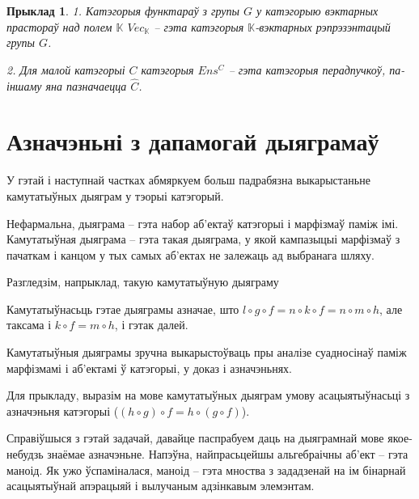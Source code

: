 \documentclass[a4paper,12pt]{book}
\newtheorem{example}{Прыклад}[section]
\begin{document}
\begin{example}
  1. Катэгорыя функтараў з групы $G$ у катэгорыю вэктарных прастораў над
  полем $\mathbb{K}$ $Vec_{\mathbb{K}}$ -- гэта катэгорыя
  $\mathbb{K}$-вэктарных рэпрэзэнтацый групы $G$.

  2. Для малой катэгорыі $C$ катэгорыя $Ens^C$ -- гэта катэгорыя
  перадпучкоў, па-іншаму яна пазначаецца $\hat{C}$.
\end{example}

\section{Азначэньні з дапамогай дыяграмаў}

У гэтай і наступнай частках абмяркуем больш падрабязна выкарыстаньне
камутатыўных дыяграм у тэорыі катэгорый.

Нефармальна, дыяграма -- гэта набор аб'ектаў катэгорыі і марфізмаў
паміж імі. Камутатыўная дыяграма -- гэта такая дыяграма, у якой
кампазыцыі марфізмаў з пачаткам і канцом у тых самых аб'ектах не
залежаць ад выбранага шляху.

Разгледзім, напрыклад, такую камутатыўную дыяграму


Камутатыўнасьць гэтае дыяграмы азначае, што $l \circ g \circ f = n
\circ k \circ f = n \circ m \circ h$, але таксама і $k \circ f = m
\circ h$, і гэтак далей.

Камутатыўныя дыяграмы зручна выкарыстоўваць пры аналізе суадносінаў
паміж марфізмамі і аб'ектамі ў катэгорыі, у доказ і азначэньнях.

Для прыкладу, выразім на мове камутатыўных дыяграм умову
асацыятыўнасьці з азначэньня катэгорыі ($(h \circ g) \circ f = h
\circ (g \circ f)$).


Справіўшыся з гэтай задачай, давайце паспрабуем даць на дыяграмнай
мове якое-небудзь знаёмае азначэньне. Напэўна, найпрасьцейшы
альгебраічны аб'ект -- гэта маноід. Як ужо ўспаміналася, маноід --
гэта мноства з зададзенай на ім бінарнай асацыятыўнай апэрацыяй і
вылучаным адзінкавым элемэнтам.
\end{document}
